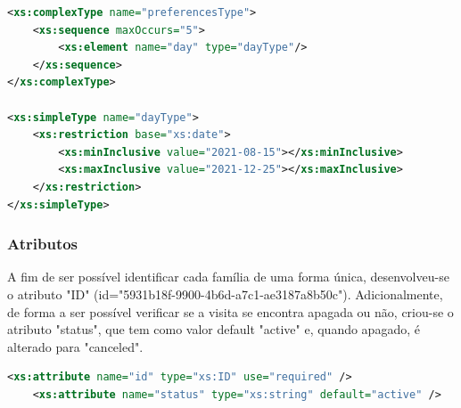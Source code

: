 \documentclass{article}
\begin{document}
\begin{itemize}
\begin{itemize}
\begin{lstlisting}[language=XML, caption=preferencesType e dayType]
<xs:complexType name="preferencesType">
    <xs:sequence maxOccurs="5">
        <xs:element name="day" type="dayType"/>
    </xs:sequence>
</xs:complexType>

<xs:simpleType name="dayType">
    <xs:restriction base="xs:date">
        <xs:minInclusive value="2021-08-15"></xs:minInclusive> 
        <xs:maxInclusive value="2021-12-25"></xs:maxInclusive> 
    </xs:restriction>
</xs:simpleType>
\end{lstlisting}
     \end{itemize}
\end{itemize}

\subsubsection{Atributos}
\hspace{0.5cm} A fim de ser possível identificar cada família de uma forma única, desenvolveu-se o atributo "ID" (id="5931b18f-9900-4b6d-a7c1-ae3187a8b50c"). Adicionalmente, de forma a ser possível verificar se a visita se encontra apagada ou não, criou-se o atributo "status", que tem como valor default "active"  e, quando apagado, é alterado para "canceled". \par

\begin{lstlisting}[language=XML, caption=Atributos]
    <xs:attribute name="id" type="xs:ID" use="required" />
    <xs:attribute name="status" type="xs:string" default="active" />
\end{lstlisting}
\end{document}
